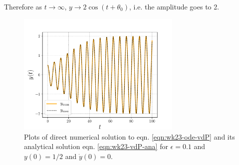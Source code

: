 Therefore as $t \rightarrow \infty$, $y \rightarrow 2 \cos (t+\theta_0)$, i.e. the amplitude goes to 2.
\begin{figure}[!h]
	\centering
	\includegraphics[width=0.7\textwidth]{./plots/pdf/strogatz-wk23-vdP.pdf}
	\caption{Plots of direct numerical solution to eqn. \ref{eqn:wk23-ode-vdP} and its analytical solution eqn. \ref{eqn:wk23-vdP-ana} for $\epsilon=0.1$ and $y(0)=1/2$ and $\dot{y}(0)=0$.}
	\label{fig:wk23-ex2-vdP}
\end{figure}\\

